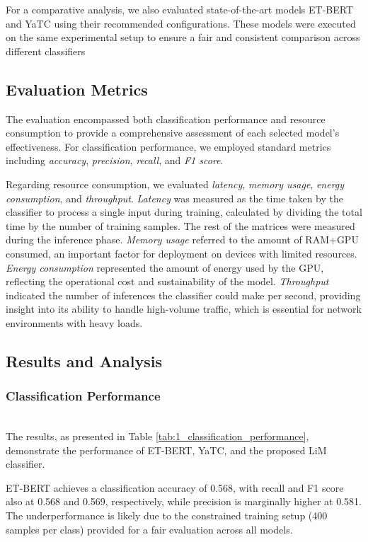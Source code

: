 For a comparative analysis, we also evaluated state-of-the-art models ET-BERT and YaTC using their recommended configurations. These models were executed on the same experimental setup to ensure a fair and consistent comparison across different classifiers

\subsection{Evaluation Metrics}
The evaluation encompassed both classification performance and resource consumption to provide a comprehensive assessment of each selected model's effectiveness. For classification performance, we employed standard metrics including \textit{accuracy}, \textit{precision}, \textit{recall}, and \textit{F1 score}.

Regarding resource consumption, we evaluated \textit{latency}, \textit{memory usage}, \textit{energy consumption}, and \textit{throughput}. \textit{Latency} was measured as the time taken by the classifier to process a single input during training, calculated by dividing the total time by the number of training samples. The rest of the matrices were measured during the inference phase. \textit{Memory usage} referred to the amount of RAM+GPU consumed, an important factor for deployment on devices with limited resources. \textit{Energy consumption} represented the amount of energy used by the GPU, reflecting the operational cost and sustainability of the model. \textit{Throughput} indicated the number of inferences the classifier could make per second, providing insight into its ability to handle high-volume traffic, which is essential for network environments with heavy loads. 

\subsection{Results and Analysis}

\subsubsection{Classification Performance} \label{subsubsec:classification} \hfill\\
The results, as presented in Table \ref{tab:1_classification_performance}, demonstrate the performance of ET-BERT, YaTC, and the proposed LiM classifier.



ET-BERT achieves a classification accuracy of 0.568, with recall and F1 score also at 0.568 and 0.569, respectively, while precision is marginally higher at 0.581. The underperformance is likely due to the constrained training setup (400 samples per class) provided for a fair evaluation across all models.

